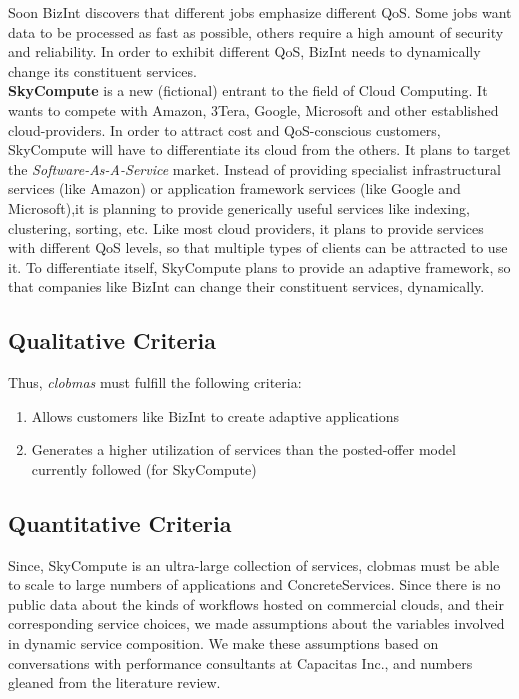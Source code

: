 \documentclass[10pt,journal,compsoc]{IEEEtran}
\begin{document}
Soon BizInt discovers that different jobs emphasize different QoS. Some jobs want data to be processed as fast as possible, others require a high amount of security and reliability. In order to exhibit different QoS, BizInt needs to dynamically change its constituent services. \\
\textbf{SkyCompute} is a new (fictional) entrant to the field of Cloud Computing. It wants to compete with Amazon, 3Tera, Google, Microsoft and other established cloud-providers. In order to attract cost and QoS-conscious customers, SkyCompute will have to differentiate its cloud from the others. It plans to target the \textit{Software-As-A-Service} market. Instead of providing specialist infrastructural services (like Amazon) or application framework services (like Google and Microsoft),it is planning to provide generically useful services like indexing, clustering, sorting, etc. Like most cloud providers, it plans to provide services with different QoS levels, so that multiple types of clients can be attracted to use it. To differentiate itself, SkyCompute plans to provide an adaptive framework, so that companies like BizInt can change their constituent services, dynamically.

\subsection{Qualitative Criteria}
Thus, \textit{clobmas} must fulfill the following criteria:
\begin{enumerate}
		\item Allows customers like BizInt to create adaptive applications
		\item Generates a higher utilization of services than the posted-offer model currently followed (for SkyCompute)
	\end{enumerate}

\subsection{Quantitative Criteria}
Since, SkyCompute is an ultra-large collection of services, clobmas must be able to scale to large numbers of applications and ConcreteServices. Since there is no public data about the kinds of workflows hosted on commercial clouds, and their corresponding service choices, we made assumptions about the variables involved in dynamic service composition. We make these assumptions based on conversations with performance consultants at Capacitas Inc., and numbers gleaned from the literature review.
       	  
\end{document}
